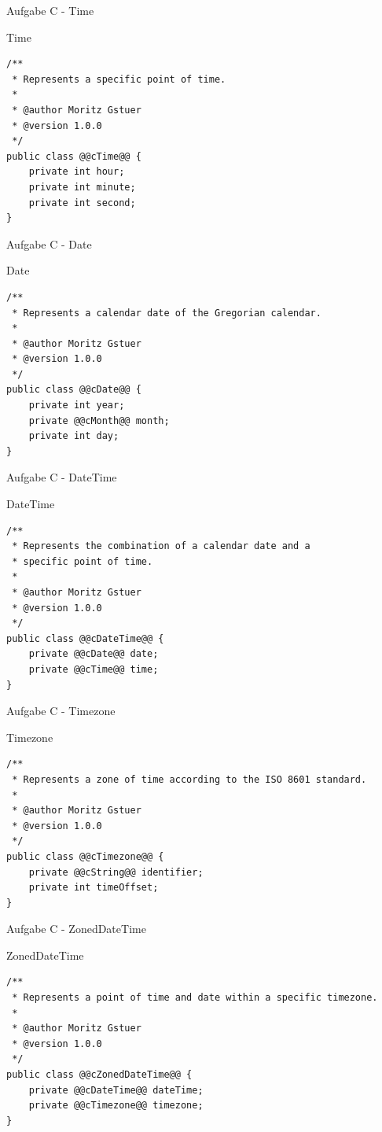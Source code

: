 \documentclass[aspectratio=169]{beamer}
\begin{document}
\begin{frame}[fragile]{Aufgabe C - Time}
  \begin{block}{Time}
    \begin{lstlisting}
/**
 * Represents a specific point of time.
 *
 * @author Moritz Gstuer
 * @version 1.0.0
 */
public class @@cTime@@ {
    private int hour;
    private int minute;
    private int second;
}
    \end{lstlisting}
  \end{block}
\end{frame}

\begin{frame}[fragile]{Aufgabe C - Date}
  \begin{block}{Date}
    \begin{lstlisting}
/**
 * Represents a calendar date of the Gregorian calendar.
 *
 * @author Moritz Gstuer
 * @version 1.0.0
 */
public class @@cDate@@ {
    private int year;
    private @@cMonth@@ month;
    private int day;
}
    \end{lstlisting}
  \end{block}
\end{frame}

\begin{frame}[fragile]{Aufgabe C - DateTime}
  \begin{block}{DateTime}
    \begin{lstlisting}
/**
 * Represents the combination of a calendar date and a
 * specific point of time.
 *
 * @author Moritz Gstuer
 * @version 1.0.0
 */
public class @@cDateTime@@ {
    private @@cDate@@ date;
    private @@cTime@@ time;
}
    \end{lstlisting}
  \end{block}
\end{frame}

\begin{frame}[fragile]{Aufgabe C - Timezone}
  \begin{block}{Timezone}
    \begin{lstlisting}
/**
 * Represents a zone of time according to the ISO 8601 standard.
 *
 * @author Moritz Gstuer
 * @version 1.0.0
 */
public class @@cTimezone@@ {
    private @@cString@@ identifier;
    private int timeOffset;
}
    \end{lstlisting}
  \end{block}
\end{frame}

\begin{frame}[fragile]{Aufgabe C - ZonedDateTime}
  \begin{block}{ZonedDateTime}
    \begin{lstlisting}
/**
 * Represents a point of time and date within a specific timezone.
 *
 * @author Moritz Gstuer
 * @version 1.0.0
 */
public class @@cZonedDateTime@@ {
    private @@cDateTime@@ dateTime;
    private @@cTimezone@@ timezone;
}
    \end{lstlisting}
  \end{block}
\end{frame}
\end{document}

